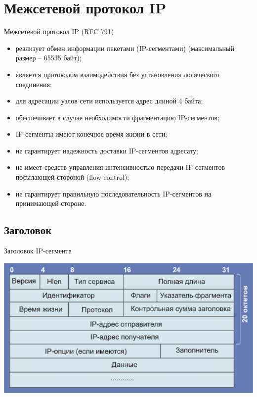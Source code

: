 \section[IP]{Межсетевой протокол IP}
\begin{frame}{Межсетевой протокол IP (RFC 791)}
	\begin{itemize}
		\item реализует обмен информации пакетами (IP-сегментами) (максимальный размер -- 65535 байт);
		\item является протоколом взаимодействия без установления логического соединения;
		\item для адресации узлов сети используется адрес длиной 4 байта;
		\item обеспечивает в случае необходимости фрагментацию IP-сегментов;
		\item IP-сегменты имеют конечное время жизни в сети;
		\item не гарантирует надежность доставки IP-сегментов адресату;
		\item не имеет средств управления интенсивностью передачи IP-сегментов посылающей стороной (flow control);
		\item не гарантирует правильную последовательность IP-сегментов на принимающей стороне.
	\end{itemize}
\end{frame}
\subsection{Заголовок}
\begin{frame}{Заголовок IP-сегмента}
	\begin{center}
		\includegraphics[width=1\textwidth]{03-ip_format.png}
	\end{center}

\end{frame}

